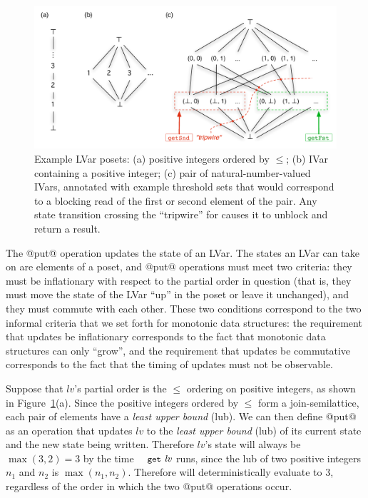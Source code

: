 \begin{figure}
\centering
\includegraphics[width=5in]{chapter2/figures/lvars-example-lattices.pdf} 
  \caption{Example LVar posets: (a) positive integers ordered by
    $\leq$; (b) IVar containing a positive integer; (c) pair of
    natural-number-valued IVars, annotated with example threshold sets
    that would correspond to a blocking read of the first or second
    element of the pair.  Any state transition crossing the
    ``tripwire'' for  causes it to unblock and return
    a result.}
  \label{f:lvars-example-lattices}
\end{figure}

The @put@ operation updates the state of an LVar.  The states an LVar
can take on are elements of a poset, and @put@ operations must meet
two criteria: they must be inflationary with respect to the partial
order in question (that is, they must move the state of the LVar
``up'' in the poset or leave it unchanged), and they must commute with
each other.  These two conditions correspond to the two informal
criteria that we set forth for monotonic data structures: the
requirement that updates be inflationary corresponds to the fact that
monotonic data structures can only ``grow'', and the requirement that
updates be commutative corresponds to the fact that the timing of
updates must not be observable.


Suppose that $\mathit{lv}$'s partial order is the $\leq$ ordering on
positive integers, as shown in
Figure~\ref{f:lvars-example-lattices}(a).  Since the positive integers
ordered by $\leq$ form a join-semilattice, each pair of elements have
a \emph{least upper bound} (lub).  We can then define @put@ as an
operation that updates $\mathit{lv}$ to the \emph{least upper bound}
(lub) of its current state and the new state being written.  Therefore
$\mathit{lv}$'s state will always be $\max(3, 2) = 3$ by the time
$\GET~\mathit{lv}$ runs, since the lub of two positive integers $n_1$
and $n_2$ is $\max(n_1, n_2)$.  Therefore  will
deterministically evaluate to $3$, regardless of the order in which
the two @put@ operations occur.

